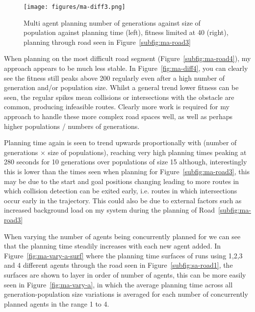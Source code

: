 \begin{figure}[ht]
  \centering
  \texttt{[image: figures/ma-diff3.png]}
  \caption{\label{fig:ma-diff3-lim40} Multi agent planning number of generations against size of population against planning time (left), fitness limited at 40 (right), planning through road seen in Figure~\ref{subfig:ma-road3}}
\end{figure}


When planning on the most difficult road segment (Figure~\ref{subfig:ma-road4}), my approach appears to be much less stable. In Figure~\ref{fig:ma-diff4}, you can clearly see the fitness still peaks above 200 regularly even after a high number of generation and/or population size. Whilst a general trend lower fitness can be seen, the regular spikes mean collisions or intersections with the obstacle are common, producing infeasible routes. Clearly more work is required for my approach to handle these more complex road spaces well, as well as perhaps higher populations / numbers of generations.

Planning time again is seen to trend upwards proportionally with (number of generations $\times$ size of populations), reaching very high planning times peaking at 280 seconds for 10 generations over populations of size 15 although, interestingly this is lower than the times seen when planning for Figure~\ref{subfig:ma-road3}, this may be due to the start and goal positions changing leading to more routes in which collision detection can be exited early, i.e. routes in which intersections occur early in the trajectory. This could also be due to external factors such as increased background load on my system during the planning of Road~\ref{subfig:ma-road3}

When varying the number of agents being concurrently planned for we can see that the planning time steadily increases with each new agent added. In Figure~\ref{fig:ma-vary-a-surf} where the planning time surfaces of runs using 1,2,3 and 4 different agents through the road seen in Figure~\ref{subfig:sa-road1}, the surfaces are shown to layer in order of number of agents, this can be more easily seen in Figure~\ref{fig:ma-vary-a}, in which the average planning time across all generation-population size variations is averaged for each number of concurrently planned agents in the range 1 to 4.

